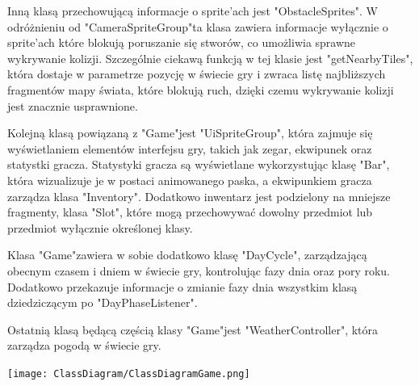 \documentclass{article}
\begin{document}
Inną klasą przechowującą informacje o sprite'ach jest "ObstacleSprites". W odróżnieniu od "CameraSpriteGroup"\space ta klasa zawiera informacje wyłącznie o sprite'ach które blokują poruszanie się stworów, co umożliwia sprawne wykrywanie kolizji. Szczególnie ciekawą funkcją w tej klasie jest "getNearbyTiles", która dostaje w parametrze pozycję w świecie gry i zwraca listę najbliższych fragmentów mapy świata, które blokują ruch, dzięki czemu wykrywanie kolizji jest znacznie usprawnione.

Kolejną klasą powiązaną z "Game"\space jest "UiSpriteGroup", która zajmuje się wyświetlaniem elementów interfejsu gry, takich jak zegar, ekwipunek oraz statystki gracza. Statystyki gracza są wyświetlane wykorzystując klasę "Bar", która wizualizuje je w postaci animowanego paska, a ekwipunkiem gracza zarządza klasa "Inventory". Dodatkowo inwentarz jest podzielony na mniejsze fragmenty, klasa "Slot", które mogą przechowywać dowolny przedmiot lub przedmiot wyłącznie określonej klasy.

Klasa "Game"\space zawiera w sobie dodatkowo klasę "DayCycle", zarządzającą obecnym czasem i dniem w świecie gry, kontrolując fazy dnia oraz pory roku. Dodatkowo przekazuje informacje o zmianie fazy dnia wszystkim klasą dziedziczącym po "DayPhaseListener".

Ostatnią klasą będącą częścią klasy "Game"\space jest "WeatherController", która zarządza pogodą w świecie gry.

\begin{center}
     \texttt{[image: ClassDiagram/ClassDiagramGame.png]}
\end{center}

\newpage
\end{document}

